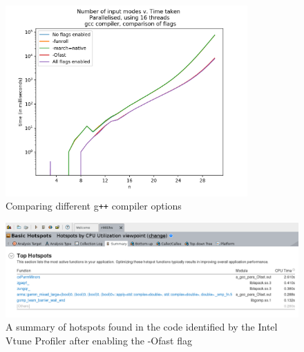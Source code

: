\documentclass[ %
                    author={Manan Vaswani},
                supervisor={Dr. Raphael Clifford},
                    degree={MEng},
                     title={A multi-core CPU implementation of the classical Boson Sampling algorithm},
                  subtitle={},
                      type={},
                      year={2019} ]{dissertation}
\theoremstyle{plain}
\theoremstyle{definition}
\begin{document}
\begin{figure}
	\centering
  \includegraphics[width=25em]{Graphs/gcc_flags_log.png}
  \caption{Comparing different g\texttt{++} compiler options}
  \label{fig:gcc_flags}
\end{figure}

\begin{figure}
	\centering
  \includegraphics[width=\textwidth, frame]{vtune_hotspots_Ofast.png}
  \caption{A summary of hotspots found in the code identified by the Intel Vtune Profiler after enabling the -Ofast flag}
  \label{fig:vtune_Ofast}
\end{figure}
\end{document}
